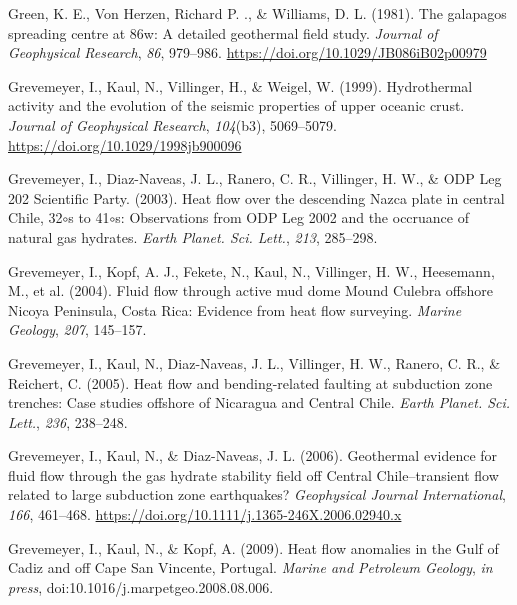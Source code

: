 \begin{CSLReferences}{1}{1}
\leavevmode{}%
Green, K. E., Von Herzen, Richard P. ., \& Williams, D. L. (1981). The galapagos spreading centre at 86\textdegree{}w: A detailed geothermal field study. \emph{Journal of Geophysical Research}, \emph{86}, 979--986. \url{https://doi.org/10.1029/JB086iB02p00979}

\leavevmode{}%
Grevemeyer, I., Kaul, N., Villinger, H., \& Weigel, W. (1999). Hydrothermal activity and the evolution of the seismic properties of upper oceanic crust. \emph{Journal of Geophysical Research}, \emph{104}(b3), 5069--5079. \url{https://doi.org/10.1029/1998jb900096}

\leavevmode{}%
Grevemeyer, I., Diaz-Naveas, J. L., Ranero, C. R., Villinger, H. W., \& ODP Leg 202 Scientific Party. (2003). Heat flow over the descending {Nazca} plate in central {Chile}, 32\(\circ\)s to 41\(\circ\)s: Observations from {ODP Leg 2002} and the occruance of natural gas hydrates. \emph{Earth Planet. Sci. Lett.}, \emph{213}, 285--298.

\leavevmode{}%
Grevemeyer, I., Kopf, A. J., Fekete, N., Kaul, N., Villinger, H. W., Heesemann, M., et al. (2004). Fluid flow through active mud dome {Mound Culebra} offshore {Nicoya Peninsula, Costa Rica}: Evidence from heat flow surveying. \emph{Marine Geology}, \emph{207}, 145--157.

\leavevmode{}%
Grevemeyer, I., Kaul, N., Diaz-Naveas, J. L., Villinger, H. W., Ranero, C. R., \& Reichert, C. (2005). Heat flow and bending-related faulting at subduction zone trenches: Case studies offshore of {Nicaragua and Central Chile}. \emph{Earth Planet. Sci. Lett.}, \emph{236}, 238--248.

\leavevmode{}%
Grevemeyer, I., Kaul, N., \& Diaz-Naveas, J. L. (2006). Geothermal evidence for fluid flow through the gas hydrate stability field off {Central Chile}--transient flow related to large subduction zone earthquakes? \emph{Geophysical Journal International}, \emph{166}, 461--468. \url{https://doi.org/10.1111/j.1365-246X.2006.02940.x}

\leavevmode{}%
Grevemeyer, I., Kaul, N., \& Kopf, A. (2009). Heat flow anomalies in the {Gulf of Cadiz} and off {Cape San Vincente, Portugal}. \emph{Marine and Petroleum Geology}, \emph{in press}, doi:10.1016/j.marpetgeo.2008.08.006.


\end{CSLReferences}

